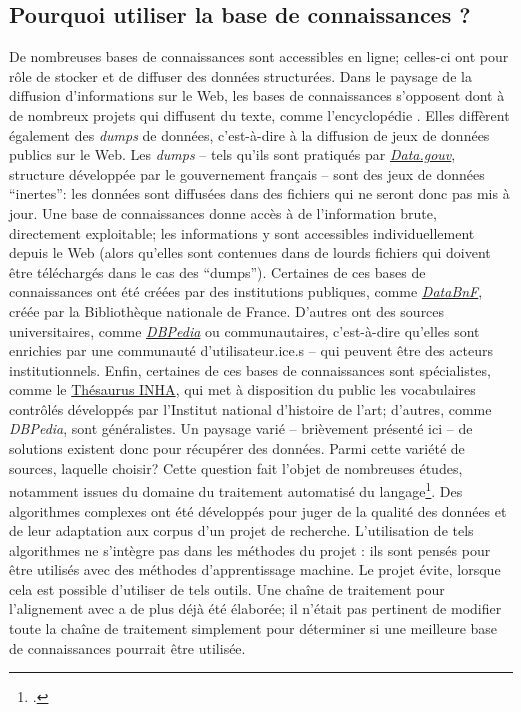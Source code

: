 \subsection{Pourquoi utiliser la base de connaissances \wkd{}?}
De nombreuses bases de connaissances sont accessibles en ligne; celles-ci ont pour rôle de stocker et de diffuser des données structurées. Dans le paysage de la diffusion d'informations sur le Web, les bases de connaissances s'opposent dont à de nombreux projets qui diffusent du texte, comme l'encyclopédie \wkd{}. Elles diffèrent également des \textit{dumps} de données, c'est-à-dire à la diffusion de jeux de données publics sur le Web. Les \textit{dumps} -- tels qu'ils sont pratiqués par \href{https://www.data.gouv.fr/fr/}{\textit{Data.gouv}}, structure développée par le gouvernement français -- sont des jeux de données \enquote{inertes}: les données sont diffusées dans des fichiers qui ne seront donc pas mis à jour. Une base de connaissances donne accès à de l'information brute, directement exploitable; les informations y sont accessibles individuellement depuis le Web (alors qu'elles sont contenues dans de lourds fichiers qui doivent être téléchargés dans le cas des \enquote{dumps}). Certaines de ces bases de connaissances ont été créées par des institutions publiques, comme \href{https://data.bnf.fr/}{\textit{DataBnF}}, créée par la Bibliothèque nationale de France. D'autres ont des sources universitaires, comme \href{https://www.dbpedia.org/}{\textit{DBPedia}} ou communautaires, c'est-à-dire qu'elles sont enrichies par une communauté d'utilisateur.ice.s -- qui peuvent être des acteurs institutionnels. Enfin, certaines de ces bases de connaissances sont spécialistes, comme le \href{https://thesaurus.inha.fr/thesaurus/}{Thésaurus INHA}, qui met à disposition du public les vocabulaires contrôlés développés par l'Institut national d'histoire de l'art; d'autres, comme \textit{DBPedia}, sont généralistes. Un paysage varié -- brièvement présenté ici -- de solutions existent donc pour récupérer des données. Parmi cette variété de sources, laquelle choisir? Cette question fait l'objet de nombreuses études, notamment issues du domaine du traitement automatisé du langage\footcite{brando_evaluation_2016}. Des algorithmes complexes ont été développés pour juger de la qualité des données et de leur adaptation aux corpus d'un projet de recherche. L'utilisation de tels algorithmes ne s'intègre pas dans les méthodes du projet \ktb{}: ils sont pensés pour être utilisés avec des méthodes d'apprentissage machine. Le projet \mssktb{} évite, lorsque cela est possible d'utiliser de tels outils. Une chaîne de traitement pour l'alignement avec \wkd{} a de plus déjà été élaborée; il n'était pas pertinent de modifier toute la chaîne de traitement simplement pour déterminer si une meilleure base de connaissances pourrait être utilisée.

